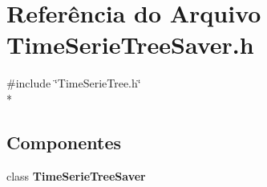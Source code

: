 \section{Referência do Arquivo Time\+Serie\+Tree\+Saver.\+h}
\label{_time_serie_tree_saver_8h}
{\ttfamily \#include \char`\"{}Time\+Serie\+Tree.\+h\char`\"{}}\\*
\subsection*{Componentes}
\begin{DoxyCompactItemize}
\item 
class {\bf Time\+Serie\+Tree\+Saver}
\end{DoxyCompactItemize}
